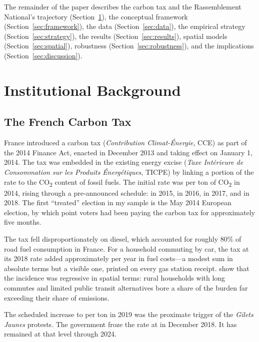 \documentclass[12pt]{article}
\providecommand{\euro}{\texteuro}
\newcommand{\rn}{Rassemblement National}
\newcommand{\gj}{\textit{Gilets Jaunes}}
\begin{document}
The remainder of the paper describes the carbon tax and the \rn{}'s trajectory (Section~\ref{sec:background}), the conceptual framework (Section~\ref{sec:framework}), the data (Section~\ref{sec:data}), the empirical strategy (Section~\ref{sec:strategy}), the results (Section~\ref{sec:results}), spatial models (Section~\ref{sec:spatial}), robustness (Section~\ref{sec:robustness}), and the implications (Section~\ref{sec:discussion}).



\section{Institutional Background}
\label{sec:background}

\subsection{The French Carbon Tax}

France introduced a carbon tax (\textit{Contribution Climat-\'{E}nergie}, CCE) as part of the 2014 Finance Act, enacted in December 2013 and taking effect on January 1, 2014. The tax was embedded in the existing energy excise (\textit{Taxe Int\'{e}rieure de Consommation sur les Produits \'{E}nerg\'{e}tiques}, TICPE) by linking a portion of the rate to the CO\textsubscript{2} content of fossil fuels. The initial rate was \euro 7 per ton of CO\textsubscript{2} in 2014, rising through a pre-announced schedule: \euro 14.50 in 2015, \euro 22 in 2016, \euro 30.50 in 2017, and \euro 44.60 in 2018. The first ``treated'' election in my sample is the May 2014 European election, by which point voters had been paying the carbon tax for approximately five months.

The tax fell disproportionately on diesel, which accounted for roughly 80\% of road fuel consumption in France. For a household commuting by car, the tax at its 2018 rate added approximately \euro 120 per year in fuel costs---a modest sum in absolute terms but a visible one, printed on every gas station receipt. \citet{bureau2019distributional} show that the incidence was regressive in spatial terms: rural households with long commutes and limited public transit alternatives bore a share of the burden far exceeding their share of emissions.

The scheduled increase to \euro 55 per ton in 2019 was the proximate trigger of the \gj{} protests. The government froze the rate at \euro 44.60 in December 2018. It has remained at that level through 2024.
\end{document}
